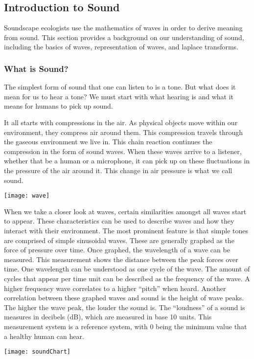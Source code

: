 \subsection{Introduction to Sound}
Soundscape ecologists use the mathematics of waves in order to derive meaning from sound. This section provides a background on our understanding of sound, including the basics of waves, representation of waves, and laplace transforms.

\subsubsection{What is Sound?}
The simplest form of sound that one can listen to is a tone. But what does it mean for us to hear a tone? We must start with what hearing is and what it means for humans to pick up sound.\par
It all starts with compressions in the air. As physical objects move within our environment, they compress air around them. This compression travels through the gaseous environment we live in. This chain reaction continues the compression in the form of sound waves. When these waves arrive to a listener, whether that be a human or a microphone, it can pick up on these fluctuations in the pressure of the air around it. This change in air pressure is what we call sound.
\begin{center}
  \texttt{[image: wave]} \\[12pt]
\end{center}
\cite{villanueva}
When we take a closer look at waves, certain similarities amongst all waves start to appear. These characteristics can be used to describe waves and how they interact with their environment. The most prominent feature is that simple tones are comprised of simple sinusoidal waves. These are generally graphed as the force of pressure over time. Once graphed, the wavelength of a wave can be measured. This measurement shows the distance between the peak forces over time. One wavelength can be understood as one cycle of the wave. The amount of cycles that appear per time unit can be described as the frequency of the wave. A higher frequency wave correlates to a higher ``pitch'' when heard. Another correlation between these graphed waves and sound is the height of wave peaks. The higher the wave peak, the louder the sound is. The ``loudness'' of a sound is measures in decibels (dB), which are measured in base 10 units. This measurement system is a reference system, with 0 being the minimum value that a healthy human can hear.\cite{villanueva}
\begin{center}
  \texttt{[image: soundChart]} \\[12pt]
	\cite{sound}
\end{center}

